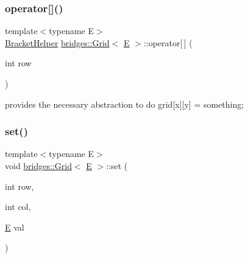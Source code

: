 \subsubsection{\texorpdfstring{operator[]()}{operator[]()}\hspace{0.1cm}{\footnotesize\ttfamily [2/2]}}
{\footnotesize\ttfamily template$<$typename E$>$ \\
\mbox{\hyperlink{classbridges_1_1_grid_1_1_bracket_helper}{Bracket\+Helper}} \mbox{\hyperlink{classbridges_1_1_grid}{bridges\+::\+Grid}}$<$ \mbox{\hyperlink{namespacebridges_acfb0a4f7877d8f63de3e6862004c50eda3a3ea00cfc35332cedf6e5e9a32e94da}{E}} $>$\+::operator\mbox{[}$\,$\mbox{]} (\begin{DoxyParamCaption}\item[{int}]{row }\end{DoxyParamCaption})\hspace{0.3cm}{\ttfamily [inline]}}



provides the necessary abstraction to do grid\mbox{[}x\mbox{]}\mbox{[}y\mbox{]} = something; 

\mbox{\label{classbridges_1_1_grid_acd750e5886349488257aba85f0b06f6f}} 
\subsubsection{\texorpdfstring{set()}{set()}}
{\footnotesize\ttfamily template$<$typename E$>$ \\
void \mbox{\hyperlink{classbridges_1_1_grid}{bridges\+::\+Grid}}$<$ \mbox{\hyperlink{namespacebridges_acfb0a4f7877d8f63de3e6862004c50eda3a3ea00cfc35332cedf6e5e9a32e94da}{E}} $>$\+::set (\begin{DoxyParamCaption}\item[{int}]{row,  }\item[{int}]{col,  }\item[{\mbox{\hyperlink{namespacebridges_acfb0a4f7877d8f63de3e6862004c50eda3a3ea00cfc35332cedf6e5e9a32e94da}{E}}}]{val }\end{DoxyParamCaption})\hspace{0.3cm}{\ttfamily [inline]}}

\mbox{\label{classbridges_1_1_grid_a8e5e4d92097f9d1481a14219eb5cc5a8}} 
